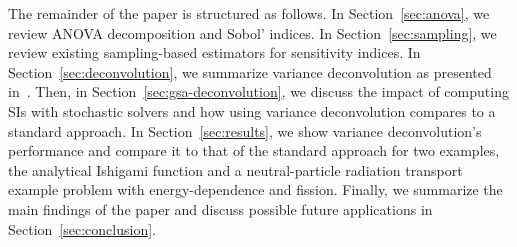 The remainder of the paper is structured as follows.
In Section~\ref{sec:anova}, we review ANOVA decomposition and Sobol' indices.
In Section~\ref{sec:sampling}, we review existing sampling-based estimators for sensitivity indices.
In Section~\ref{sec:deconvolution}, we summarize variance deconvolution as presented in~\cite{clements-etal-2024}. 
Then, in Section~\ref{sec:gsa-deconvolution}, we discuss the impact of computing SIs with stochastic solvers and how using variance deconvolution compares to a standard approach. 
In Section~\ref{sec:results}, we show variance deconvolution's performance and compare it to that of the standard approach for two examples, the analytical Ishigami function and a neutral-particle radiation transport example problem with energy-dependence and fission.
Finally, we summarize the main findings of the paper and discuss possible future applications in Section~\ref{sec:conclusion}.
